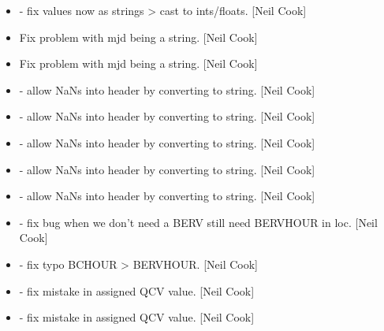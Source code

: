\documentclass[a4paper,10pt,english]{report}
\begin{document}
\begin{itemize}
\item {} 
 - fix values now as strings \textendash{}\textgreater{} cast to ints/floats.
{[}Neil Cook{]}

\item {} 
Fix problem with mjd being a string. {[}Neil Cook{]}

\item {} 
Fix problem with mjd being a string. {[}Neil Cook{]}

\item {} 
 - allow NaNs into header by converting to string. {[}Neil
Cook{]}

\item {} 
 - allow NaNs into header by converting to string. {[}Neil
Cook{]}

\item {} 
 - allow NaNs into header by converting to string. {[}Neil
Cook{]}

\item {} 
 - allow NaNs into header by converting to string. {[}Neil
Cook{]}

\item {} 
 - allow NaNs into header by converting to string. {[}Neil
Cook{]}

\item {} 
 - fix bug when we don’t need a BERV still need BERVHOUR
in loc. {[}Neil Cook{]}

\item {} 
 - fix typo BCHOUR \textendash{}\textgreater{} BERVHOUR. {[}Neil Cook{]}

\item {} 
 - fix mistake in assigned QCV value. {[}Neil Cook{]}

\item {} 
 - fix mistake in assigned QCV value. {[}Neil Cook{]}

\end{itemize}
\end{document}

